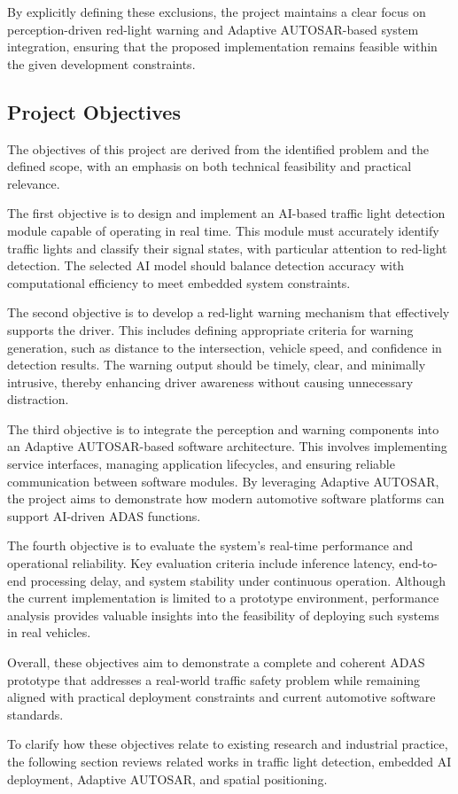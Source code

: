 By explicitly defining these exclusions, the project maintains a clear focus on perception-driven red-light warning and Adaptive AUTOSAR-based system integration, ensuring that the proposed implementation remains feasible within the given development constraints.

\subsection{Project Objectives}

The objectives of this project are derived from the identified problem and the defined scope, with an emphasis on both technical feasibility and practical relevance.

The first objective is to design and implement an AI-based traffic light detection module capable of operating in real time. This module must accurately identify traffic lights and classify their signal states, with particular attention to red-light detection. The selected AI model should balance detection accuracy with computational efficiency to meet embedded system constraints.

The second objective is to develop a red-light warning mechanism that effectively supports the driver. This includes defining appropriate criteria for warning generation, such as distance to the intersection, vehicle speed, and confidence in detection results. The warning output should be timely, clear, and minimally intrusive, thereby enhancing driver awareness without causing unnecessary distraction.

The third objective is to integrate the perception and warning components into an Adaptive AUTOSAR-based software architecture. This involves implementing service interfaces, managing application lifecycles, and ensuring reliable communication between software modules. By leveraging Adaptive AUTOSAR, the project aims to demonstrate how modern automotive software platforms can support AI-driven ADAS functions.

The fourth objective is to evaluate the system’s real-time performance and operational reliability. Key evaluation criteria include inference latency, end-to-end processing delay, and system stability under continuous operation. Although the current implementation is limited to a prototype environment, performance analysis provides valuable insights into the feasibility of deploying such systems in real vehicles.

Overall, these objectives aim to demonstrate a complete and coherent ADAS prototype that addresses a real-world traffic safety problem while remaining aligned with practical deployment constraints and current automotive software standards. 

To clarify how these objectives relate to existing research and industrial practice, the following section reviews related works in traffic light detection, embedded AI deployment, Adaptive AUTOSAR, and spatial positioning.
